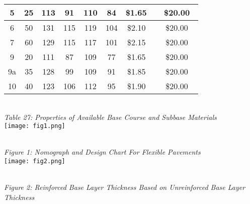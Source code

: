 \documentclass{article}
\begin{document}
\begin{center}
\begin{tabular}{|c|c|c|c|c|c|c|c|}
        \hline
        5 & 25              & 113                   & 91                        & 110                                      & 84                     & \$1.65~                      & ~\$20.00~                 \\ 
        \hline
        6                     & 50              & 131                   & 115                       & 119                                      & 104                    & \$2.10~                      & ~\$20.00~                 \\ 
        \hline
        7                     & 60              & 129                   & 115                       & 117                                      & 101                    & \$2.15~                      & ~\$20.00~                 \\ 
        \hline
        9 & 20              & 111                   & 87                        & 109                                      & 77                     & \$1.65~                      & ~\$20.00~                 \\ 
        \hline
        9a                    & 35              & 128                   & 99                        & 109                                      & 91                     & \$1.85~                      & ~\$20.00~                 \\ 
        \hline
        10                    & 40              & 123                   & 106                       & 112                                      & 95                     & \$1.90~                      & ~\$20.00~                 \\
        \hline
    \end{tabular}
    \vspace{0mm}
    \emph{\\Table 27: Properties of Available Base Course and Subbase Materials\\} 
    \vspace{7mm}
    \texttt{[image: fig1.png]}
    \vspace{3mm}
    \emph{\\Figure 1: Nomograph and Design Chart For Flexible Pavements\\} 
    \newpage
    \texttt{[image: fig2.png]}
    \vspace{3mm}
    \emph{\\Figure 2: Reinforced Base Layer Thickness Based on Unreinforced Base Layer Thickness\\} 
\end{center}
\end{document}

